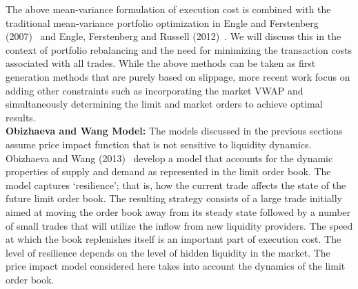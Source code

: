 The above mean-variance formulation of execution cost is combined with the traditional mean-variance portfolio optimization in Engle and Ferstenberg (2007)~\cite{engle2007} and Engle, Ferstenberg and Russell (2012)~\cite{engle2012}. We will discuss this in the context of portfolio rebalancing and the need for minimizing the transaction costs associated with all trades. While the above methods can be taken as first generation methods that are purely based on slippage, more recent work focus on adding other constraints such as incorporating the market VWAP and simultaneously determining the limit and market orders to achieve optimal results. \\


\noindent\textbf{Obizhaeva and Wang Model:} The models discussed in the previous sections assume price impact function that is not sensitive to liquidity dynamics. Obizhaeva and Wang (2013)~\cite{obizhaeva} develop a model that accounts for the dynamic properties of supply and demand as represented in the limit order book. The model captures `resilience'; that is, how the current trade affects the state of the future limit order book. The resulting strategy consists of a large trade initially aimed at moving the order book away from its steady state followed by a number of small trades that will utilize the inflow from new liquidity providers. The speed at which the book replenishes itself is an important part of execution cost. The level of resilience depends on the level of hidden liquidity in the market. The price impact model considered here takes into account the dynamics of the limit order book.


